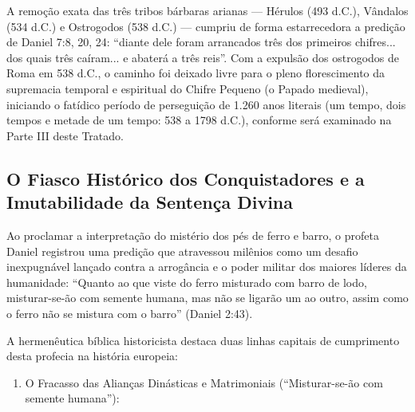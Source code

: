 \documentclass[11pt,a4paper,openany]{book}
\begin{document}
A remoção exata das três tribos bárbaras arianas — Hérulos (493 d.C.), Vândalos (534 d.C.) e Ostrogodos (538 d.C.) — cumpriu de forma estarrecedora a predição de Daniel 7:8, 20, 24: ``diante dele foram arrancados três dos primeiros chifres... dos quais três caíram... e abaterá a três reis''.
Com a expulsão dos ostrogodos de Roma em 538 d.C., o caminho foi deixado livre para o pleno florescimento da supremacia temporal e espiritual do Chifre Pequeno (o Papado medieval), iniciando o fatídico período de perseguição de 1.260 anos literais (um tempo, dois tempos e metade de um tempo: 538 a 1798 d.C.), conforme será examinado na Parte III deste Tratado.


\subsection{O Fiasco Histórico dos Conquistadores e a Imutabilidade da Sentença Divina}


Ao proclamar a interpretação do mistério dos pés de ferro e barro, o profeta Daniel registrou uma predição que atravessou milênios como um desafio inexpugnável lançado contra a arrogância e o poder militar dos maiores líderes da humanidade:
``Quanto ao que viste do ferro misturado com barro de lodo, misturar-se-ão com semente humana, mas não se ligarão um ao outro, assim como o ferro não se mistura com o barro'' (Daniel 2:43).

A hermenêutica bíblica historicista destaca duas linhas capitais de cumprimento desta profecia na história europeia:

\begin{enumerate}
  \item O Fracasso das Alianças Dinásticas e Matrimoniais (``Misturar-se-ão com semente humana''):
\end{enumerate}
\end{document}
